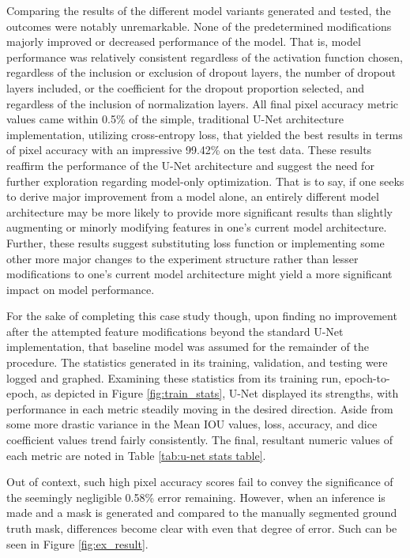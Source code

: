 \documentclass{article}
\begin{document}
\begin{multicols}{2}
Comparing the results of the different model variants generated and tested, the outcomes were notably unremarkable. None of the predetermined modifications majorly improved or decreased performance of the model. That is, model performance was relatively consistent regardless of the activation function chosen, regardless of the inclusion or exclusion of dropout layers, the number of dropout layers included, or the coefficient for the dropout proportion selected, and regardless of the inclusion of normalization layers. All final pixel accuracy metric values came within 0.5\% of the simple, traditional U-Net architecture implementation, utilizing cross-entropy loss, that yielded the best results in terms of pixel accuracy with an impressive 99.42\% on the test data. These results reaffirm the performance of the U-Net architecture and suggest the need for further exploration regarding model-only optimization. That is to say, if one seeks to derive major improvement from a model alone, an entirely different model architecture may be more likely to provide more significant results than slightly augmenting or minorly modifying features in one’s current model architecture. Further, these results suggest substituting loss function or implementing some other more major changes to the experiment structure rather than lesser modifications to one’s current model architecture might yield a more significant impact on model performance.

For the sake of completing this case study though, upon finding no improvement after the attempted feature modifications beyond the standard U-Net implementation, that baseline model was assumed for the remainder of the procedure. The statistics generated in its training, validation, and testing were logged and graphed. Examining these statistics from its training run, epoch-to-epoch, as depicted in Figure \ref{fig:train_stats},  U-Net displayed its strengths, with performance in each metric steadily moving in the desired direction. Aside from some more drastic variance in the Mean IOU values, loss, accuracy, and dice coefficient values trend fairly consistently. The final, resultant numeric values of each metric are noted in Table \ref{tab:u-net stats table}.

Out of context, such high pixel accuracy scores fail to convey the significance of the seemingly negligible 0.58\% error remaining. However, when an inference is made and a mask is generated and compared to the manually segmented ground truth mask, differences become clear with even that degree of error. Such can be seen in Figure \ref{fig:ex_result}. 


\end{multicols}
\end{document}
